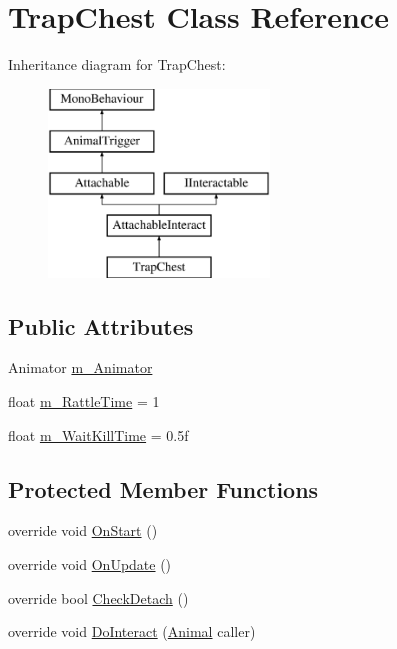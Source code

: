 \hypertarget{class_trap_chest}{}\section{Trap\+Chest Class Reference}
\label{class_trap_chest}
Inheritance diagram for Trap\+Chest\+:\begin{figure}[H]
\begin{center}
\leavevmode
\includegraphics[height=5.000000cm]{class_trap_chest}
\end{center}
\end{figure}
\subsection*{Public Attributes}
\begin{DoxyCompactItemize}
\item 
Animator \mbox{\hyperlink{class_trap_chest_ad7ab3a3b4c3d686726939377497ccc9b}{m\+\_\+\+Animator}}
\item 
float \mbox{\hyperlink{class_trap_chest_a42d826ae35440fd2fb88e0fc9ff02751}{m\+\_\+\+Rattle\+Time}} = 1
\item 
float \mbox{\hyperlink{class_trap_chest_adcdef4147a8944ffd1e8012b837a2b5e}{m\+\_\+\+Wait\+Kill\+Time}} = 0.\+5f
\end{DoxyCompactItemize}
\subsection*{Protected Member Functions}
\begin{DoxyCompactItemize}
\item 
override void \mbox{\hyperlink{class_trap_chest_a4579ba0a67f7426ffeea20df606c9ea7}{On\+Start}} ()
\item 
override void \mbox{\hyperlink{class_trap_chest_a8e86df57796079618494f48e727cc782}{On\+Update}} ()
\item 
override bool \mbox{\hyperlink{class_trap_chest_ab8f0424386ce3ac8f7e0a08bd503c4f5}{Check\+Detach}} ()
\item 
override void \mbox{\hyperlink{class_trap_chest_afe04e422ad7c45f5de0509504412c3dc}{Do\+Interact}} (\mbox{\hyperlink{class_animal}{Animal}} caller)
\end{DoxyCompactItemize}
